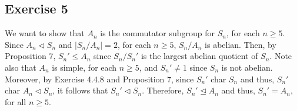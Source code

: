 \subsection*{Exercise 5}
We want to show that $A_n$ is the commutator subgroup for $S_n$, for each $n \ge 5$. Since $A_n \triangleleft S_n$ and $|S_n/A_n| = 2$, for each $n \ge 5$, $S_n/A_n$ is abelian. Then, by Proposition 7, $S_n' \le A_n$ since $S_n/S_n'$ is the largest abelian quotient of $S_n$. Note also that $A_n$ is simple, for each $n \ge 5$, and $S_n' \not= 1$ since $S_n$ is not abelian. Moreover, by Exercise 4.4.8 and Proposition 7, since $S_n'$ char $S_n$ and thus, $S_n'$ char $A_n \triangleleft S_n$, it follows that $S_n' \triangleleft S_n$. Therefore, $S_n' \trianglelefteq A_n$ and thus, $S_n' = A_n$, for all $n \ge 5$.